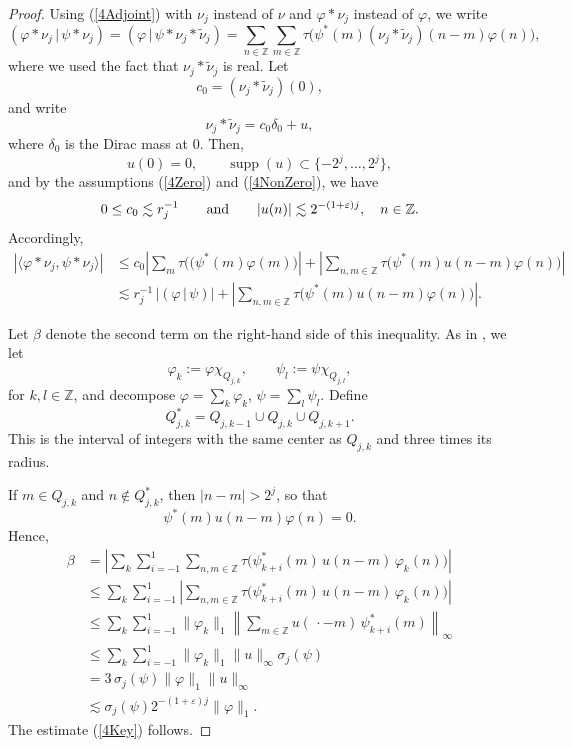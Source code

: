 \documentclass[12pt]{amsart}
\newcommand{\Zdb}{\mbox{$\mathbb{Z}$}}
\theoremstyle{remark}
\theoremstyle{definition}
\numberwithin{equation}{section}
\begin{document}
\begin{proof}
Using (\ref{4Adjoint}) with $\nu_j$ instead of $\nu$
and $\varphi *\nu_j$ instead of $\varphi$, we write
\[
(\varphi*\nu_j\,\vert \,\psi*\nu_j)
=
(\varphi\,\vert\,\psi*\nu_j*\widetilde{\nu}_j)
=
\sum_{n\in\mathbb Z}
\sum_{m\in\mathbb Z}
\tau\!\bigl(
\psi^*(m)(\nu_j*\widetilde{\nu}_j)(n-m)\varphi(n)
\bigr),
\]
where we used the fact that $\nu_j*\widetilde{\nu}_j$ is real. Let
\[
c_0=(\nu_j*\widetilde{\nu}_j)(0),
\]
and write
\[
\nu_j*\widetilde{\nu}_j
=
c_0\delta_0+u,
\]
where $\delta_0$ is the Dirac mass at $0$.
Then,
\[
u(0)=0,\qquad
\operatorname{supp}(u)\subset \{-2^j,\ldots, 2^j\},
\]
and by the assumptions
(\ref{4Zero}) and (\ref{4NonZero}), we have
$$
0\leq c_0\lesssim r_j^{-1}\qquad\hbox{and}\qquad
|u(n)|\lesssim 2^{-(1+\varepsilon)j},
\quad n\in\mathbb Z.
$$
Accordingly,
\begin{align*}
|\langle \varphi*\nu_j,\psi *\nu_j\rangle|
& \le c_0\left|
\sum_m\tau\bigl((\psi^*(m)\varphi(m)\bigr)
\right|
+
\left|
\sum_{n,m\in\mathbb Z}
\tau\bigl(\psi^*(m)u(n-m)\varphi(n)\bigr)
\right|\\
&\lesssim
r_j^{-1}\,|(\varphi \,\vert\, \psi )|
+
\left|
\sum_{n,m\in\mathbb Z}
\tau\bigl(\psi^*(m)u(n-m)\varphi(n)\bigr)
\right|.
\end{align*}

Let $\beta$ denote the second term on the right-hand side
of this inequality.
As in \cite{LaV}, we let
\[
\varphi_k:=\varphi\chi_{Q_{j,k}},
\qquad
\psi_l:=\psi\chi_{Q_{j,l}},
\]
for $k,l\in\Zdb$, and decompose
\(\varphi=\sum_k \varphi_k\),
\(\psi=\sum_l \psi_l\). Define
\[
Q_{j,k}^*
=
Q_{j,k-1}\cup Q_{j,k}\cup Q_{j,k+1}.
\]
This is the interval of integers with the same center as $Q_{j,k}$ and
three times its radius.

If $m\in Q_{j,k}$ and $n\notin Q_{j,k}^*$, then $|n-m|>2^j$, so that
\[
\psi^*(m)u(n-m)\varphi(n)=0.
\]
Hence,
\begin{align*}
\beta
&=
\left| \sum_k \sum_{i=-1}^1 \sum_{n,m\in\mathbb Z}
\tau\bigl(\psi_{k+i}^*(m)\,
u(n-m)\,\varphi_k(n)\bigr)\right|\\
&\le \sum_k \sum_{i=-1}^1 \left| \sum_{n,m\in\mathbb Z}
\tau\bigl(\psi_{k+i}^*(m)\,u(n-m)\,\varphi_k(n)
\bigr)\right|\\
&\leq\sum_k\sum_{i=-1}^1\|\varphi_k\|_1
\left\|\sum_{m\in\mathbb Z} u(\,\cdot-m)\,
\psi_{k+i}^*(m)\right\|_\infty\\
&\leq\sum_k\sum_{i=-1}^1\|\varphi_k\|_1\|u\|_\infty
\sigma_j(\psi)\\
&= 3 \,\sigma_j(\psi) \|\varphi\|_1 \|u\|_\infty\\
&\lesssim  \sigma_j(\psi) 2^{-(1+\varepsilon)j}\|\varphi\|_1.
\end{align*}
The estimate (\ref{4Key}) follows.
\end{proof}
\end{document}
